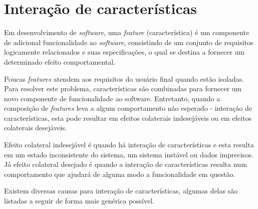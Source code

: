\section{Interação de características}
Em desenvolvimento de \textit{software}, uma \textit{feature} (característica) é um componente de adicional funcionalidade ao \textit{software}\cite{Calder:2003}, consistindo de um conjunto de requisitos logicamente relacionados e suas especificações, o qual se destina a fornecer um determinado efeito comportamental\cite{NHLABATSI:2008}.

Poucas \textit{features} atendem aos requisitos do usuário final quando estão isoladas. Para resolver este problema, características são combinadas para fornecer um novo componente de funcionalidade ao software. Entretanto, quando a composição de \textit{features} leva a algum comportamento não esperado - interação de características, esta pode resultar em efeitos colaterais indesejáveis\cite{NHLABATSI:2008} ou em efeitos colaterais desejáveis\cite{Weiss:2005}.

Efeito colateral indesejável é quando há interação de características e esta resulta em um estado inconsistente do sistema, um sistema instável ou dados imprecisos. Já efeito colateral desejado é quando a interação de características resulta num comportamento que ajudará de alguma modo a funcionalidade em questão.\cite{Weiss:2005}\cite{NHLABATSI:2008}

Existem diversas causas para interação de características, algumas delas são listadas a seguir de forma mais genérica possível.\cite{Weiss:2007}

